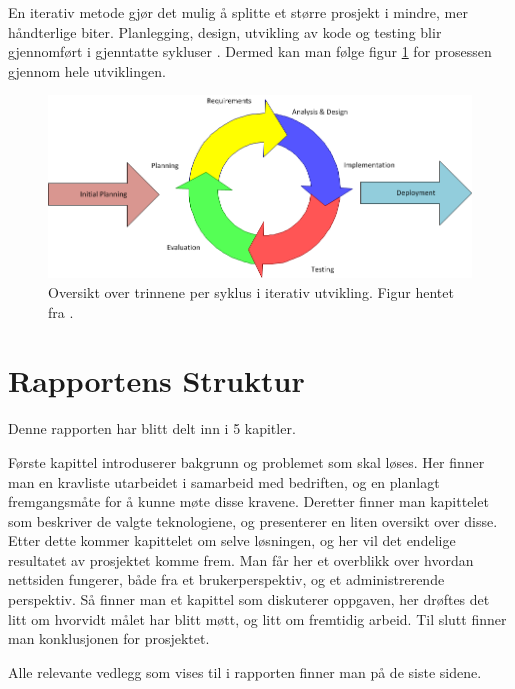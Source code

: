 En iterativ metode gjør det mulig å splitte et større prosjekt i mindre, mer håndterlige biter. Planlegging, design, utvikling av kode og testing blir gjennomført i gjenntatte sykluser \cite{method:iterative_fig}. Dermed kan man følge figur \ref{fig:iterative_development} for prosessen gjennom hele utviklingen.

 \begin{figure}[htbp]
	\centering
		\includegraphics[scale=0.5]{Bilder/iterativ_utvikling.png}
	\caption[Iterativ Utviklings Diagram]{Oversikt over trinnene per syklus i iterativ utvikling. Figur hentet fra \cite{iterative:development}. } %
	\label{fig:iterative_development}
\end{figure}



\section{Rapportens Struktur}
Denne rapporten har blitt delt inn i 5 kapitler.

Første kapittel introduserer bakgrunn og problemet som skal løses. Her finner man en kravliste utarbeidet i samarbeid med bedriften, og en planlagt fremgangsmåte for å kunne møte disse kravene. Deretter finner man kapittelet som beskriver de valgte teknologiene, og presenterer en liten oversikt over disse. Etter dette kommer kapittelet om selve løsningen, og her vil det endelige resultatet av prosjektet komme frem. Man får her et overblikk over hvordan nettsiden fungerer, både fra et brukerperspektiv, og et administrerende perspektiv. Så finner man et kapittel som diskuterer oppgaven, her drøftes det litt om hvorvidt målet har blitt møtt, og litt om fremtidig arbeid. Til slutt finner man konklusjonen for prosjektet.

Alle relevante vedlegg som vises til i rapporten finner man på de siste sidene.





\newpage